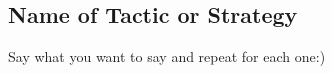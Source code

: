 \subsection{Name of Tactic or Strategy} 
\begin{flushleft}
Say what you want to say and repeat for each one:)

\end{flushleft}
